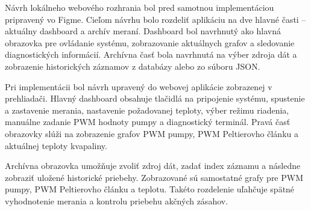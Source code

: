 \begin{figure}[H]
    \centering
    \label{fig:volanie_poziadavky_web}
\end{figure}

Návrh lokálneho webového rozhrania bol pred samotnou implementáciou pripravený vo Figme. 
Cieľom návrhu bolo rozdeliť aplikáciu na dve hlavné časti -- aktuálny dashboard a archív 
meraní. Dashboard bol navrhnutý ako hlavná obrazovka pre ovládanie systému, zobrazovanie 
aktuálnych grafov a sledovanie diagnostických informácií. Archívna časť bola navrhnutá 
na výber zdroja dát a zobrazenie historických záznamov z databázy alebo zo súboru JSON.

\begin{figure}[H]
    \centering
    \label{fig:figma_dashboard}
\end{figure}

\begin{figure}[H]
    \centering
    \label{fig:figma_archiv}
\end{figure}

Pri implementácii bol návrh upravený do webovej aplikácie zobrazenej v prehliadači. 
Hlavný dashboard obsahuje tlačidlá na pripojenie systému, spustenie a zastavenie merania, 
nastavenie požadovanej teploty, výber režimu riadenia, manuálne zadanie PWM hodnoty pumpy 
a diagnostický terminál. Pravá časť obrazovky slúži na zobrazenie grafov PWM pumpy, 
PWM Peltierovho článku a aktuálnej teploty kvapaliny.

\begin{figure}[H]
    \centering
    \label{fig:web_dashboard}
\end{figure}

Archívna obrazovka umožňuje zvoliť zdroj dát, zadať index záznamu a následne zobraziť 
uložené historické priebehy. Zobrazované sú samostatné grafy pre PWM pumpy, PWM Peltierovho 
článku a teplotu. Takéto rozdelenie uľahčuje spätné vyhodnotenie merania a kontrolu priebehu 
akčných zásahov.

\begin{figure}[H]
    \centering
    \label{fig:web_archiv}
\end{figure}

